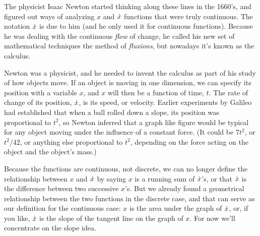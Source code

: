 
The physicist Isaac Newton started
thinking along these lines in the 1660's, and figured out ways of analyzing
$x$ and $\dot{x}$ functions that were truly continuous. The notation $\dot{x}$
is due to him (and he only used it for continuous functions). Because he was
dealing with the continuous \emph{flow} of change, he called his new set of mathematical
techniques the method of \emph{fluxions}, but nowadays it's known as the calculus.

Newton was a physicist, and he needed to invent the calculus as part of his study
of how objects move. If an object is moving in one dimension, we can specify its
position with a variable $x$, and $x$ will then be a function of time, $t$.
The rate of change of its position, $\dot{x}$, is its speed, or velocity.
Earlier experiments by Galileo
had established that when a ball rolled down
a slope, its position was proportional to $t^2$, so Newton inferred that
a graph like figure  would be typical for any object
moving under the influence of a constant force. (It could be $7t^2$, or
$t^2/42$, or anything else proportional to $t^2$, depending on the force
acting on the object and the object's mass.)

Because the functions are continuous, not discrete, we can no longer define
the relationship between $x$ and $\dot{x}$ by saying $x$ is a running sum of
$\dot{x}$'s, or that $\dot{x}$ is the difference between two successive $x$'s.
But we already found a geometrical relationship between the two functions
in the discrete case, and that can serve as our definition for the continuous
case: $x$ is the area under the graph of $\dot{x}$, or, if you like,
$\dot{x}$ is the slope of the tangent line on the graph of $x$. For now
we'll concentrate on the slope idea.

